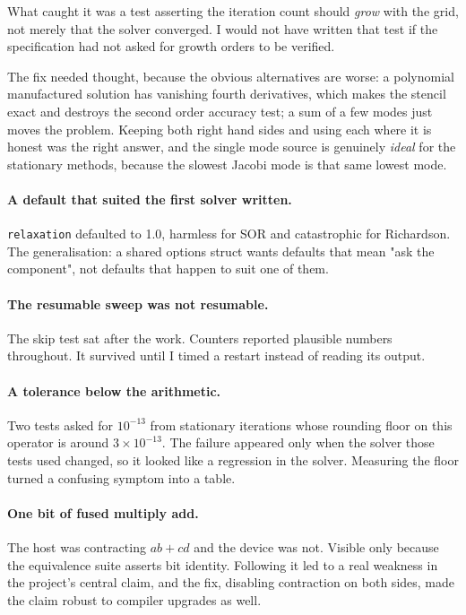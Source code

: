 \documentclass[11pt,a4paper]{report}
\begin{document}
What caught it was a test asserting the iteration count should \emph{grow} with
the grid, not merely that the solver converged. I would not have written that
test if the specification had not asked for growth orders to be verified.

The fix needed thought, because the obvious alternatives are worse: a polynomial
manufactured solution has vanishing fourth derivatives, which makes the stencil
exact and destroys the second order accuracy test; a sum of a few modes just
moves the problem. Keeping both right hand sides and using each where it is
honest was the right answer, and the single mode source is genuinely \emph{ideal}
for the stationary methods, because the slowest Jacobi mode is that same lowest
mode.

\paragraph{A default that suited the first solver written.}
\texttt{relaxation} defaulted to 1.0, harmless for SOR and catastrophic for
Richardson. The generalisation: a shared options struct wants defaults that mean
"ask the component", not defaults that happen to suit one of them.

\paragraph{The resumable sweep was not resumable.} The skip test sat after the
work. Counters reported plausible numbers throughout. It survived until I timed a
restart instead of reading its output.

\paragraph{A tolerance below the arithmetic.} Two tests asked for $10^{-13}$ from
stationary iterations whose rounding floor on this operator is around
$3\times10^{-13}$. The failure appeared only when the solver those tests used
changed, so it looked like a regression in the solver. Measuring the floor turned
a confusing symptom into a table.

\paragraph{One bit of fused multiply add.} The host was contracting $ab + cd$ and
the device was not. Visible only because the equivalence suite asserts bit
identity. Following it led to a real weakness in the project's central claim, and
the fix, disabling contraction on both sides, made the claim robust to compiler
upgrades as well.
\end{document}
